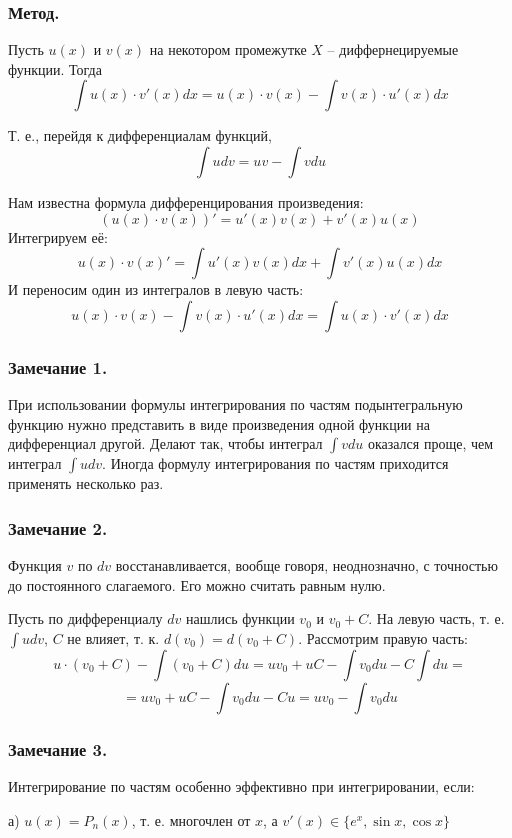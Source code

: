 \subsubsection{Метод.}
Пусть $u(x)$ и $v(x)$ на некотором промежутке $X$ -- диффернецируемые функции. Тогда
$$\int u(x)\cdot v'(x)dx=u(x)\cdot v(x) - \int v(x) \cdot u'(x)dx$$

Т. е., перейдя к дифференциалам функций,
$$\int udv=uv- \int vdu$$

\dokvo
Нам известна формула дифференцирования произведения:
$$(u(x)\cdot v(x))'=u'(x)v(x)+v'(x)u(x)$$
Интегрируем её:
$$u(x)\cdot v(x)'=\int u'(x)v(x) dx +\int v'(x)u(x) dx$$
И переносим один из интегралов в левую часть:
$$u(x)\cdot v(x) - \int v(x) \cdot u'(x)dx=\int u(x)\cdot v'(x)dx$$

\dokno

\subsubsection{Замечание 1.}

При использовании формулы интегрирования по частям подынтегральную функцию нужно представить в виде произведения одной функции на дифференциал другой.
Делают так, чтобы интеграл $\int vdu$ оказался проще, чем интеграл $\int udv$.
Иногда формулу интегрирования по частям приходится применять несколько раз.

\subsubsection{Замечание 2.}

Функция $v$ по $dv$ восстанавливается, вообще говоря, неоднозначно, с точностью до постоянного слагаемого. Его можно считать равным нулю.

\dokvo
Пусть по дифференциалу $dv$ нашлись функции $v_0$ и $v_0+C$. На левую часть, т. е. $\int udv$, $C$ не влияет, т. к. $d(v_0)=d(v_0+C)$. Рассмотрим правую часть:
$$
u\cdot (v_0+C) - \int (v_0+C)du=
uv_0+uC-\int v_0 du - C\int du=$$$$=
uv_0+uC-\int v_0 du - Cu=
uv_0-\int v_0 du
$$
\dokno

\subsubsection{Замечание 3.}
Интегрирование по частям особенно эффективно при интегрировании, если:

а) $u(x)=P_n(x)$, т. е. многочлен от $x$, а $v'(x) \in \{e^x,\sin x,\cos x\}$


